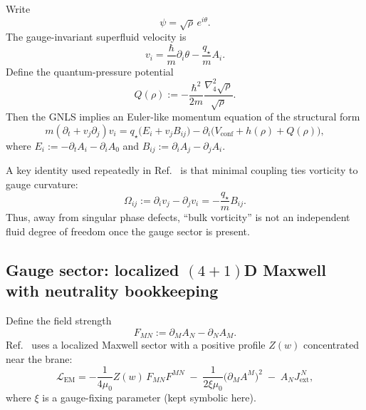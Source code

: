 \documentclass[11pt]{article}
\newcommand{\qstar}{q_\star}
\begin{document}
Write
\begin{equation}
\psi=\sqrt{\rho}\,e^{i\theta}.
\end{equation}
The gauge-invariant superfluid velocity is
\begin{equation}
\boxed{
v_i = \frac{\hbar}{m}\partial_i\theta - \frac{\qstar}{m}A_i.
}
\label{eq:recap_velocity}
\end{equation}
Define the quantum-pressure potential
\begin{equation}
Q(\rho) := -\frac{\hbar^2}{2m}\frac{\nabla_4^2\sqrt{\rho}}{\sqrt{\rho}}.
\label{eq:recap_quantum_pressure}
\end{equation}
Then the GNLS implies an Euler-like momentum equation of the structural form
\begin{equation}
\boxed{
m(\partial_t+v_j\partial_j)v_i
=
\qstar\big(E_i+v_j B_{ij}\big)
-\partial_i\!\big(V_{\mathrm{conf}}+h(\rho)+Q(\rho)\big),
}
\label{eq:recap_euler_like}
\end{equation}
where $E_i:=-\partial_tA_i-\partial_iA_0$ and $B_{ij}:=\partial_iA_j-\partial_jA_i$.

A key identity used repeatedly in Ref.~\cite{norris2026_4d_model} is that minimal coupling ties vorticity to gauge curvature:
\begin{equation}
\boxed{
\Omega_{ij}:=\partial_i v_j-\partial_j v_i
=
-\frac{\qstar}{m}B_{ij}.
}
\label{eq:recap_vorticity_identity}
\end{equation}
Thus, away from singular phase defects, ``bulk vorticity'' is not an independent fluid degree of freedom once the gauge sector is present.

\subsection{Gauge sector: localized \texorpdfstring{$(4+1)$}{(4+1)}D Maxwell with neutrality bookkeeping}
\label{sec:recap_em}

Define the field strength
\begin{equation}
F_{MN}:=\partial_M A_N-\partial_N A_M.
\end{equation}
Ref.~\cite{norris2026_4d_model} uses a localized Maxwell sector with a positive profile $Z(w)$ concentrated near the brane:
\begin{equation}
\mathcal{L}_{\mathrm{EM}}
=
-\frac{1}{4\mu_0}Z(w)\,F_{MN}F^{MN}
\;-\;\frac{1}{2\xi\mu_0}\big(\partial_M A^M\big)^2
\;-\;A_N J_{\mathrm{ext}}^{\,N},
\label{eq:recap_em_lagrangian}
\end{equation}
where $\xi$ is a gauge-fixing parameter (kept symbolic here).
\end{document}
